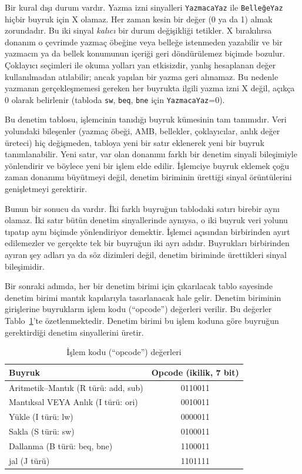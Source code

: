 Bir kural dışı durum vardır. Yazma izni sinyalleri \texttt{YazmacaYaz} ile \texttt{BelleğeYaz} hiçbir buyruk için X olamaz. Her zaman kesin bir değer (0 ya da 1) almak zorundadır. Bu iki sinyal \emph{kalıcı} bir durum değişikliği tetikler. X bırakılırsa donanım o çevrimde yazmaç öbeğine veya belleğe istenmeden yazabilir ve bir yazmacın ya da bellek konumunun içeriği geri döndürülemez biçimde bozulur. Çoklayıcı seçimleri ile okuma yolları yan etkisizdir, yanlış hesaplanan değer kullanılmadan atılabilir; ancak yapılan bir yazma geri alınamaz. Bu nedenle yazmanın gerçekleşmemesi gereken her buyrukta ilgili yazma izni X değil, açıkça 0 olarak belirlenir (tabloda \texttt{sw}, \texttt{beq}, \texttt{bne} için \texttt{YazmacaYaz}=0).

Bu denetim tablosu, işlemcinin tanıdığı buyruk kümesinin tam tanımıdır. Veri yolundaki bileşenler (yazmaç öbeği, AMB, bellekler, çoklayıcılar, anlık değer üreteci) hiç değişmeden, tabloya yeni bir satır eklenerek yeni bir buyruk tanımlanabilir. Yeni satır, var olan donanımı farklı bir denetim sinyali bileşimiyle yönlendirir ve böylece yeni bir işlem elde edilir. İşlemciye buyruk eklemek çoğu zaman donanımı büyütmeyi değil, denetim biriminin ürettiği sinyal örüntülerini genişletmeyi gerektirir.

Bunun bir sonucu da vardır. İki farklı buyruğun tablodaki satırı birebir aynı olamaz. İki satır bütün denetim sinyallerinde aynıysa, o iki buyruk veri yolunu tıpatıp aynı biçimde yönlendiriyor demektir. İşlemci açısından birbirinden ayırt edilemezler ve gerçekte tek bir buyruğun iki ayrı adıdır. Buyrukları birbirinden ayıran şey adları ya da söz dizimleri değil, denetim biriminde ürettikleri sinyal bileşimidir.

Bir sonraki adımda, her bir denetim birimi için çıkarılacak tablo sayesinde denetim birimi mantık kapılarıyla tasarlanacak hale gelir. Denetim biriminin girişlerine buyrukların işlem kodu (``opcode'') değerleri verilir. Bu değerler Tablo~\ref{tab:islem-kodu}'te özetlenmektedir. Denetim birimi bu işlem koduna göre buyruğun gerektirdiği denetim sinyallerini üretir.

\begin{table}[htbp]
\centering
\caption{İşlem kodu (``opcode'') değerleri}
\label{tab:islem-kodu}
\begin{tabular}{lc}
\toprule
\textbf{Buyruk} & \textbf{Opcode (ikilik, 7 bit)} \\
\midrule
Aritmetik--Mantık (R türü: add, sub) & 0110011 \\
Mantıksal VEYA Anlık (I türü: ori) & 0010011 \\
Yükle (I türü: lw) & 0000011 \\
Sakla (S türü: sw) & 0100011 \\
Dallanma (B türü: beq, bne) & 1100011 \\
jal (J türü) & 1101111 \\
\bottomrule
\end{tabular}
\end{table}

